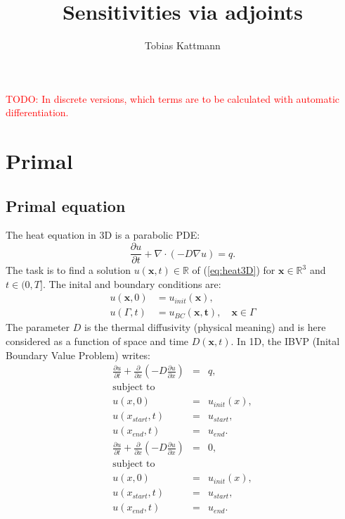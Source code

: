 \documentclass[10pt]{article}
\begin{document}
\title{Sensitivities via adjoints}
\author{Tobias Kattmann}
\maketitle
\tableofcontents
\textcolor{red}{TODO: In discrete versions, which terms are to be calculated with automatic differentiation.}
\section{Primal}
\subsection{Primal equation}
The heat equation in 3D is a parabolic PDE:
\begin{equation}\label{eq:heat3D}
\frac{\partial u}{\partial t} + \nabla\cdot \left(- D\nabla u \right) = q.
\end{equation}
The task is to find a solution $u\left(\mathbf{x}, t\right)\in\mathbb{R}$ of  (\ref{eq:heat3D}) for $\mathbf{x}\in\mathbb{R}^3$ and $t\in(0,T]$. The inital and boundary conditions are:
\begin{align}
u(\mathbf{x},0) & = u_{init}(\mathbf{x}), \\
u(\Gamma,t) & = u_{BC}(\mathbf{x,t}), \quad \mathbf{x}\in\Gamma
\end{align}
The parameter $D$ is the thermal diffusivity (physical meaning) and is here considered as a function of space and time $D\left(\mathbf{x},t\right)$. In 1D, the IBVP (Inital Boundary Value Problem) writes:
\begin{eqnarray}
\frac{\partial u}{\partial t} +\frac{\partial}{\partial x} \left(- D \frac{\partial u}{\partial x}  \right) &=& q, \\
\text{subject to} \\
u(x,0) &=& u_{init}(x), \\
u(x_{start},t)&=& u_{start}, \\
u(x_{end},t) &=& u_{end}.
\end{eqnarray}
\begin{eqnarray}
\frac{\partial u}{\partial t} +\frac{\partial}{\partial x} \left(- D \frac{\partial u}{\partial x}  \right) &=& 0, \\
\text{subject to} \\
u(x,0) &=& u_{init}(x), \\
u(x_{start},t)&=& u_{start}, \\
u(x_{end},t) &=& u_{end}.
\end{eqnarray}
\end{document}
